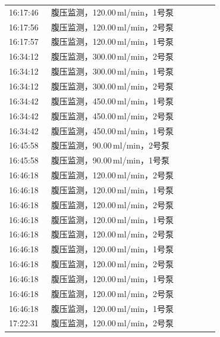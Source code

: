 \documentclass[UTF8,10pt,a4paper,fontset=fandol]{ctexart}
\begin{document}
\begin{center}
\begin{tabular}{p{0.18\linewidth}p{0.72\linewidth}}
16:17:46 & 腹压监测，120.00\,ml/min，1号泵\\
16:17:56 & 腹压监测，120.00\,ml/min，2号泵\\
16:17:57 & 腹压监测，120.00\,ml/min，1号泵\\
16:34:12 & 腹压监测，300.00\,ml/min，2号泵\\
16:34:12 & 腹压监测，300.00\,ml/min，1号泵\\
16:34:12 & 腹压监测，300.00\,ml/min，2号泵\\
16:34:42 & 腹压监测，450.00\,ml/min，1号泵\\
16:34:42 & 腹压监测，450.00\,ml/min，2号泵\\
16:34:42 & 腹压监测，450.00\,ml/min，1号泵\\
16:45:58 & 腹压监测，90.00\,ml/min，2号泵\\
16:45:58 & 腹压监测，90.00\,ml/min，1号泵\\
16:46:18 & 腹压监测，120.00\,ml/min，2号泵\\
16:46:18 & 腹压监测，120.00\,ml/min，1号泵\\
16:46:18 & 腹压监测，120.00\,ml/min，2号泵\\
16:46:18 & 腹压监测，120.00\,ml/min，1号泵\\
16:46:18 & 腹压监测，120.00\,ml/min，2号泵\\
16:46:18 & 腹压监测，120.00\,ml/min，1号泵\\
16:46:18 & 腹压监测，120.00\,ml/min，2号泵\\
16:46:18 & 腹压监测，120.00\,ml/min，1号泵\\
16:46:18 & 腹压监测，120.00\,ml/min，2号泵\\
16:46:18 & 腹压监测，120.00\,ml/min，1号泵\\
17:22:31 & 腹压监测，120.00\,ml/min，2号泵\\
\end{tabular}
\end{center}


\newpage

\end{document}
